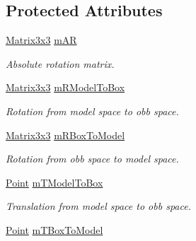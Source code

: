 \subsection*{Protected Attributes}
\begin{DoxyCompactItemize}
\item 
\hyperlink{classMatrix3x3}{Matrix3x3} \hyperlink{classOBBCollider_a3f2a35512d607384b9d24cc3b937aa16}{m\+AR}\hypertarget{classOBBCollider_a3f2a35512d607384b9d24cc3b937aa16}{}\label{classOBBCollider_a3f2a35512d607384b9d24cc3b937aa16}

\begin{DoxyCompactList}\small\item\em Absolute rotation matrix. \end{DoxyCompactList}\item 
\hyperlink{classMatrix3x3}{Matrix3x3} \hyperlink{classOBBCollider_a43d821460eea05ea9e2dd86b5a5dcadf}{m\+R\+Model\+To\+Box}\hypertarget{classOBBCollider_a43d821460eea05ea9e2dd86b5a5dcadf}{}\label{classOBBCollider_a43d821460eea05ea9e2dd86b5a5dcadf}

\begin{DoxyCompactList}\small\item\em Rotation from model space to obb space. \end{DoxyCompactList}\item 
\hyperlink{classMatrix3x3}{Matrix3x3} \hyperlink{classOBBCollider_a197766ce684173100fba6eaa7131e1a3}{m\+R\+Box\+To\+Model}\hypertarget{classOBBCollider_a197766ce684173100fba6eaa7131e1a3}{}\label{classOBBCollider_a197766ce684173100fba6eaa7131e1a3}

\begin{DoxyCompactList}\small\item\em Rotation from obb space to model space. \end{DoxyCompactList}\item 
\hyperlink{classPoint}{Point} \hyperlink{classOBBCollider_a5eb9ff0a018d75d717f193d390af58fc}{m\+T\+Model\+To\+Box}\hypertarget{classOBBCollider_a5eb9ff0a018d75d717f193d390af58fc}{}\label{classOBBCollider_a5eb9ff0a018d75d717f193d390af58fc}

\begin{DoxyCompactList}\small\item\em Translation from model space to obb space. \end{DoxyCompactList}\item 
\hyperlink{classPoint}{Point} \hyperlink{classOBBCollider_a0eb63cd1ff29e3fff66807c88f940162}{m\+T\+Box\+To\+Model}\hypertarget{classOBBCollider_a0eb63cd1ff29e3fff66807c88f940162}{}\label{classOBBCollider_a0eb63cd1ff29e3fff66807c88f940162}


\end{DoxyCompactItemize}
